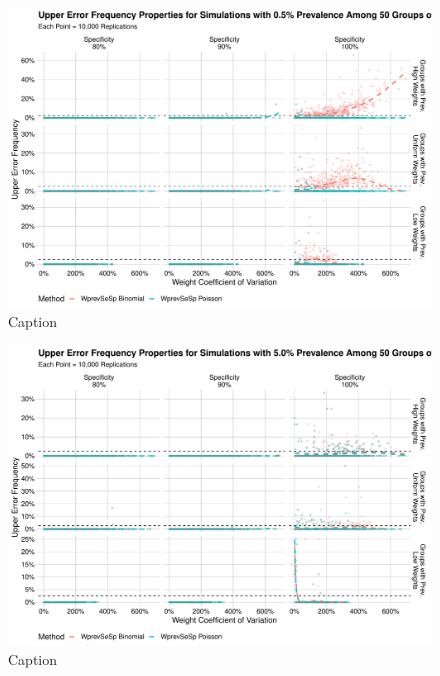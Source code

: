 \documentclass[AMA,STIX1COL]{WileyNJD-v2}
\begin{document}
\begin{figure}
    \centering
    \includegraphics[width=\textwidth]{figures/imperfect_upper_error_frequency_50_0_005_reduced.pdf}
    \caption{Caption}
    \label{fig:imperfect_upper_error_frequency_50_0_005_reduced}
\end{figure}


\begin{figure}
    \centering
    \includegraphics[width=\textwidth]{figures/imperfect_upper_error_frequency_50_0_05_reduced.pdf}
    \caption{Caption}
    \label{fig:imperfect_upper_error_frequency_50_0_05_reduced}
\end{figure}
\end{document}
